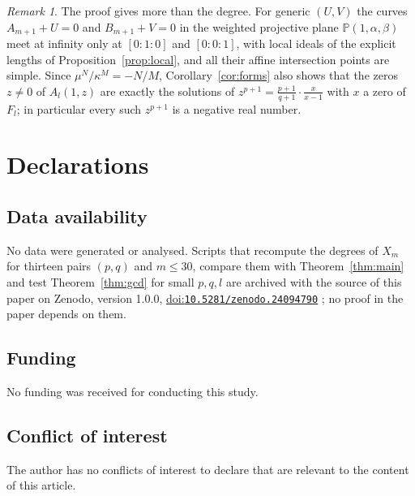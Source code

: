 \documentclass[11pt]{amsart}
\theoremstyle{definition}
\theoremstyle{remark}
\newtheorem{remark}[theorem]{Remark}
\numberwithin{equation}{section}
\providecommand{\doi}[1]{\href{https://doi.org/#1}{doi:\nolinkurl{#1}}}
\begin{document}
\begin{remark}
The proof gives more than the degree. For generic $(U,V)$ the curves $A_{m+1}+U=0$ and $B_{m+1}+V=0$ in the weighted projective plane $\mathbb P(1,\alpha,\beta)$ \cite{Dol82} meet at infinity only at $[0:1:0]$ and $[0:0:1]$, with local ideals of the explicit lengths of Proposition~\ref{prop:local}, and all their affine intersection points are simple. Since $\mu^N/\kappa^M=-N/M$, Corollary~\ref{cor:forms} also shows that the zeros $z\ne0$ of $A_l(1,z)$ are exactly the solutions of $z^{p+1}=\frac{p+1}{q+1}\cdot\frac{x}{x-1}$ with $x$ a zero of $F_l$; in particular every such $z^{p+1}$ is a negative real number.
\end{remark}

\section*{Declarations}

\subsection*{Data availability}
No data were generated or analysed. Scripts that recompute the degrees of $X_m$ for thirteen pairs $(p,q)$ and $m\le30$, compare them with Theorem~\ref{thm:main} and test Theorem~\ref{thm:gcd} for small $p,q,l$ are archived with the source of this paper on Zenodo, version 1.0.0, \doi{10.5281/zenodo.24094790} \cite{Archive}; no proof in the paper depends on them.

\subsection*{Funding}
No funding was received for conducting this study.

\subsection*{Conflict of interest}
The author has no conflicts of interest to declare that are relevant to the content of this article.
\end{document}
